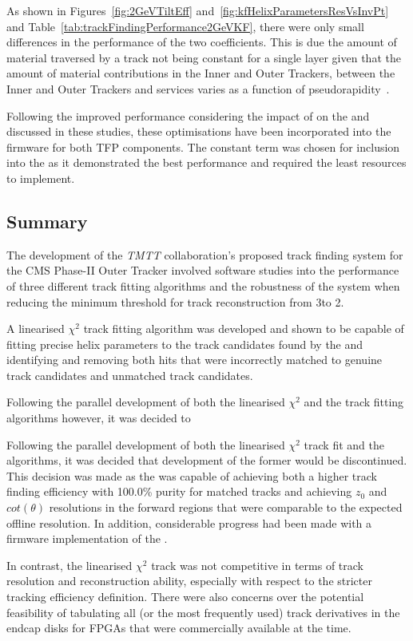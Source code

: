 As shown in Figures~\ref{fig:2GeVTiltEff} and~\ref{fig:kfHelixParametersResVsInvPt} and Table~\ref{tab:trackFindingPerformance2GeVKF}, there were only small differences in the performance of the two \MS coefficients.
This is due the amount of material traversed by a track not being constant for a single layer given that the amount of material contributions in the Inner and Outer Trackers, between the Inner and Outer Trackers and services varies as a function of pseudorapidity~\cite{P2TrackerTDR}.

Following the improved performance considering the impact of \MS on the \HT and \KF discussed in these studies, these optimisations have been incorporated into the firmware for both TFP components.
The constant \MS term was chosen for inclusion into the \KF as it demonstrated the best performance and required the least resources to implement.

\subsection{Summary}\label{subsec:Tmtt2GeV}
The development of the \emph{TMTT} collaboration's proposed track finding system for the CMS Phase-II Outer Tracker involved software studies into the performance of three different track fitting algorithms and the robustness of the system when reducing the minimum \pT threshold for track reconstruction from 3\GeV to 2\GeV.

A linearised $\chi^{2}$ track fitting algorithm was developed and shown to be capable of fitting precise helix parameters to the track candidates found by the \HT and identifying and removing both hits that were incorrectly matched to genuine track candidates and unmatched track candidates.

Following the parallel development of both the linearised $\chi^{2}$ and the \KF track fitting algorithms however, it was decided to 


Following the parallel development of both the linearised $\chi^{2}$ track fit and the \KF algorithms, it was decided that development of the former would be discontinued.
This decision was made as the \KF was capable of achieving both a higher track finding efficiency with 100.0\% purity for matched tracks and achieving $z_{0}$ and $cot(\theta)$ resolutions in the forward regions that were comparable to the expected offline resolution.
In addition, considerable progress had been made with a firmware implementation of the \KF.

In contrast, the linearised $\chi^{2}$ track was not competitive in terms of track resolution and reconstruction ability, especially with respect to the stricter tracking efficiency definition.
There were also concerns over the potential feasibility of tabulating all (or the most frequently used) track derivatives in the endcap disks for FPGAs that were commercially available at the time.

